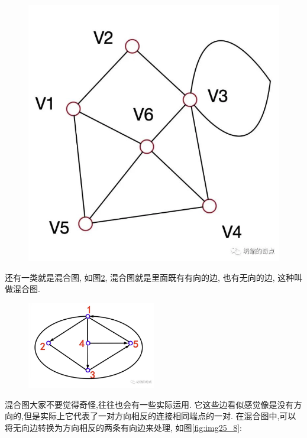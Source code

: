 \begin{figure}[ht]
\begin{minipage}[h]{0.4\textwidth}
    \includegraphics[width=\textwidth]{asset/20231227145141.png}
    \caption{}
    \label{fig:img25_6}
  \end{minipage}
\end{figure}

还有一类就是混合图, 如图\ref{fig:img25_7}, 混合图就是里面既有有向的边, 也有无向的边, 这种叫做混合图. 

\begin{figure}[ht]
  \centering
  \includegraphics[width=0.5\textwidth]{asset/20231227145154.png}
  \caption{}
  \label{fig:img25_7}
\end{figure}

混合图大家不要觉得奇怪,往往也会有一些实际运用. 它这些边看似感觉像是没有方向的,但是实际上它代表了一对方向相反的连接相同端点的一对. 在混合图中,可以将无向边转换为方向相反的两条有向边来处理, 如图\ref{fig:img25_8}: 

